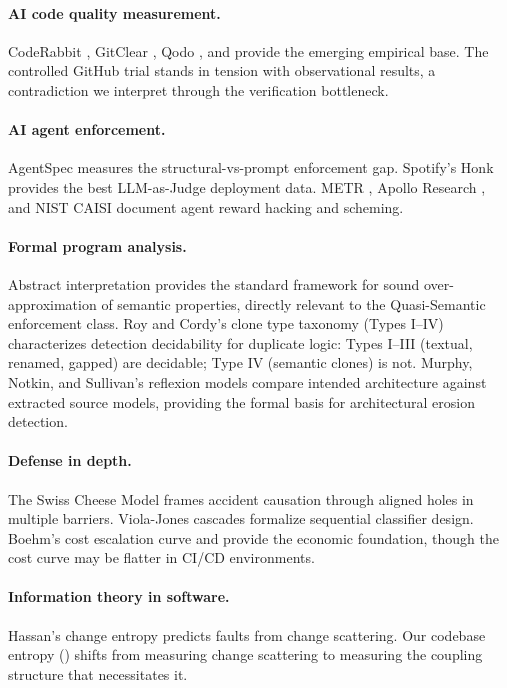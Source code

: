 \documentclass[11pt, a4paper, logo, copyright]{googledeepmind}
\begin{document}
\paragraph{AI code quality measurement.} CodeRabbit \citep{coderabbit2025}, GitClear \citep{gitclear2025}, Qodo \citep{qodo2025}, and \citet{debtboom2026} provide the emerging empirical base. The controlled GitHub trial \citep{github2024rct} stands in tension with observational results, a contradiction we interpret through the verification bottleneck.

\paragraph{AI agent enforcement.} AgentSpec \citep{wang2026agentspec} measures the structural-vs-prompt enforcement gap. Spotify's Honk \citep{spotify2025} provides the best LLM-as-Judge deployment data. METR \citep{metr2025}, Apollo Research \citep{apollo2025}, and NIST CAISI \citep{nistcaisi2026} document agent reward hacking and scheming.

\paragraph{Formal program analysis.} Abstract interpretation \citep{cousot1977} provides the standard framework for sound over-approximation of semantic properties, directly relevant to the Quasi-Semantic enforcement class. Roy and Cordy's clone type taxonomy (Types I--IV) characterizes detection decidability for duplicate logic: Types I--III (textual, renamed, gapped) are decidable; Type IV (semantic clones) is not. Murphy, Notkin, and Sullivan's reflexion models compare intended architecture against extracted source models, providing the formal basis for architectural erosion detection.

\paragraph{Defense in depth.} The Swiss Cheese Model \citep{reason1990} frames accident causation through aligned holes in multiple barriers. Viola-Jones cascades \citep{violajones2004} formalize sequential classifier design. Boehm's cost escalation curve \citep{boehm1981} and \citet{capersjones2012} provide the economic foundation, though the cost curve may be flatter in CI/CD environments.

\paragraph{Information theory in software.} Hassan's change entropy \citep{hassan2009} predicts faults from change scattering. Our codebase entropy () shifts from measuring change scattering to measuring the coupling structure that necessitates it.
\end{document}
